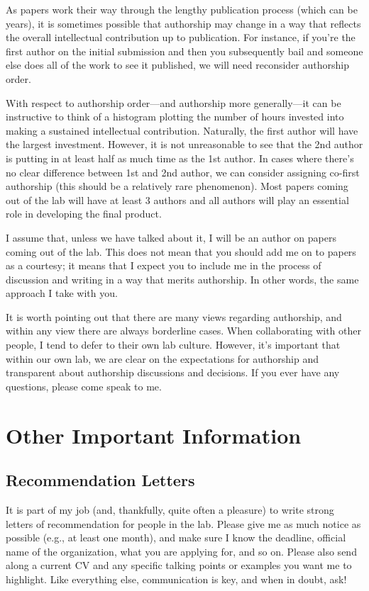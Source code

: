 \documentclass[letterpaper,11pt,oneside]{memoir}
\begin{document}
As papers work their way through the lengthy publication process (which can be years), it is sometimes possible that authorship may change in a way that reflects the overall intellectual contribution up to publication. For instance, if you're the first author on the initial submission and then you subsequently bail and someone else does all of the work to see it published, we will need reconsider authorship order.

With respect to authorship order---and authorship more generally---it can be instructive to think of a histogram plotting the number of hours invested into making a sustained intellectual contribution. Naturally, the first author will have the largest investment. However, it is not unreasonable to see that the 2nd author is putting in at least half as much time as the 1st author. In cases where there's no clear difference between 1st and 2nd author, we can consider assigning co-first authorship (this should be a relatively rare phenomenon). Most papers coming out of the lab will have at least 3 authors and all authors will play an essential role in developing the final product.

I assume that, unless we have talked about it, I will be an author on papers coming out of the lab. This does not mean that you should add me on to papers as a courtesy; it means that I expect you to include me in the process of discussion and writing in a way that merits authorship. In other words, the same approach I take with you.

It is worth pointing out that there are many views regarding authorship, and within any view there are always borderline cases. When collaborating with other people, I tend to defer to their own lab culture. However, it's important that within our own lab, we are clear on the expectations for authorship and transparent about authorship discussions and decisions. If you ever have any questions, please come speak to me.


\chapter{Other Important Information}
\section{Recommendation Letters}
It is part of my job (and, thankfully, quite often a pleasure) to write strong letters of recommendation for people in the lab. Please give me as much notice as possible (e.g., at least one month), and make sure I know the deadline, official name of the organization, what you are applying for, and so on. Please also send along a current CV and any specific talking points or examples you want me to highlight. Like everything else, communication is key, and when in doubt, ask!
\end{document}
